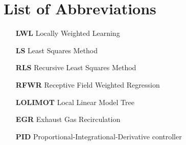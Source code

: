 \chapter*{List of Abbreviations}
\label{chap:abb}

\begin{itemize}[leftmargin=2.7cm]
	\item[\textbf{LWL}] Locally Weighted Learning
	\item[\textbf{LS}] Least Squares Method
	\item[\textbf{RLS}] Recursive Least Squares Method
	\item[\textbf{RFWR}] Receptive Field Weighted Regression
	\item[\textbf{LOLIMOT}] Local Linear Model Tree
	\item[\textbf{EGR}] Exhaust Gas Recirculation
	\item[\textbf{PID}] Proportional-Integrational-Derivative controller
	
	
\end{itemize}
